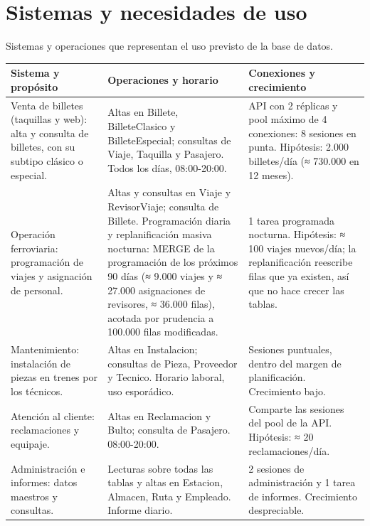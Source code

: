 \documentclass[11pt,a4paper]{article}
\DeclareRobustCommand{\_}{\textunderscore\allowbreak}
\newcommand{\cab}[1]{\textbf{#1}}
\newcommand{\filacab}{\rowcolor{cabecera}}
\begin{document}
\tableofcontents

\section{Sistemas y necesidades de uso}
Sistemas y operaciones que representan el uso previsto de la base de datos.

{\small
\begin{longtable}{L{4.1cm} L{5.6cm} L{5.6cm}}
\toprule\filacab
\cab{Sistema y propósito} & \cab{Operaciones y horario} & \cab{Conexiones y crecimiento} \\
\midrule\endhead
Venta de billetes (taquillas y web): alta y consulta de billetes, con su subtipo clásico o especial. & Altas en Billete, Billete\_Clasico y Billete\_Especial; consultas de Viaje, Taquilla y Pasajero. Todos los días, 08:00-20:00. & API con 2 réplicas y pool máximo de 4 conexiones: 8 sesiones en punta. Hipótesis: 2.000 billetes/día (≈ 730.000 en 12 meses). \\
Operación ferroviaria: programación de viajes y asignación de personal. & Altas y consultas en Viaje y Revisor\_Viaje; consulta de Billete. Programación diaria y replanificación masiva nocturna: MERGE de la programación de los próximos 90 días (≈ 9.000 viajes y ≈ 27.000 asignaciones de revisores, ≈ 36.000 filas), acotada por prudencia a 100.000 filas modificadas. & 1 tarea programada nocturna. Hipótesis: ≈ 100 viajes nuevos/día; la replanificación reescribe filas que ya existen, así que no hace crecer las tablas. \\
Mantenimiento: instalación de piezas en trenes por los técnicos. & Altas en Instalacion; consultas de Pieza, Proveedor y Tecnico. Horario laboral, uso esporádico. & Sesiones puntuales, dentro del margen de planificación. Crecimiento bajo. \\
Atención al cliente: reclamaciones y equipaje. & Altas en Reclamacion y Bulto; consulta de Pasajero. 08:00-20:00. & Comparte las sesiones del pool de la API. Hipótesis: ≈ 20 reclamaciones/día. \\
Administración e informes: datos maestros y consultas. & Lecturas sobre todas las tablas y altas en Estacion, Almacen, Ruta y Empleado. Informe diario. & 2 sesiones de administración y 1 tarea de informes. Crecimiento despreciable. \\
\bottomrule
\end{longtable}}
\end{document}
